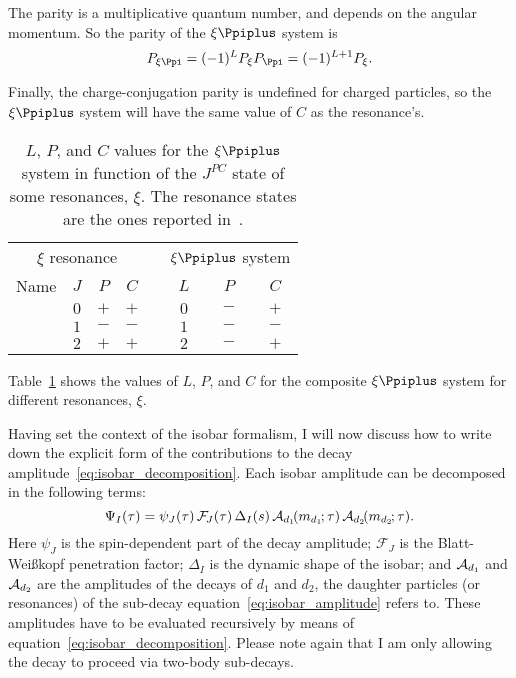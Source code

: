     The parity is a multiplicative quantum number, and depends on the angular momentum.
    So the parity of the $\xi\Ppiplus$ system is
    \begin{equation}
        P_{\xi\Ppi} = (-1)^L P_{\xi} P_{\Ppi} = (-1)^{L+1} P_{\xi}.
    \end{equation}


    Finally, the charge-conjugation parity is undefined for charged particles, so the $\xi\Ppiplus$ system will have the same value of $C$ as the resonance's. 
    \begin{table}
        \centering
        \caption{$L$, $P$, and $C$ values for the $\xi\Ppiplus$ system in function of the $J^{PC}$ state of some resonances, $\xi$.
                 The resonance states are the ones reported in~\cite{chinese_phisics}.}
        \label{table:composite_resonance_system}
        \begin{tabular}{lccccccc}
            \toprule
            \multicolumn{4}{c}{$\xi$ resonance}   & &\multicolumn{3}{c}{$\xi\Ppiplus$ system} \\ \cline{1-4} \cline{6-8}
            Name   &$J$ &$P$ &$C$                 & &$L$ &$P$ &$C$\\
            \midrule
            \Pfnez{}    &$0$ &$+$ &$+$            & &$0$ &$-$ &$+$\\
            \Prhozero{} &$1$ &$-$ &$-$            & &$1$ &$-$ &$-$\\
            \Pfii{}     &$2$ &$+$ &$+$            & &$2$ &$-$ &$+$\\
            \bottomrule
        \end{tabular}
    \end{table}
    Table~\ref{table:composite_resonance_system} shows the values of $L$, $P$, and $C$ for the composite $\xi\Ppiplus$ system for different resonances, $\xi$.


    Having set the context of the isobar formalism, I will now discuss how to write down the explicit form of the contributions to the decay amplitude~\eqref{eq:isobar_decomposition}.
    Each isobar amplitude can be decomposed in the following terms:
    \begin{equation}\label{eq:isobar_amplitude}
        \Psi_I(\tau) = \psi_J(\tau)\,\mathcal{F\!}_{J}(\tau)\,\Delta_I(s)\,\mathcal{A}_{d_1}\!(m_{d_1\!}; \tau)\,\mathcal{A}_{d_2}\!(m_{d_2\!}; \tau).
    \end{equation}
    Here $\psi_J$ is the spin-dependent part of the decay amplitude;
    $\mathcal{F\!}_J$ is the Blatt-Wei\ss{}kopf penetration factor;
    $\Delta_I$ is the dynamic shape of the isobar;
    and $\mathcal{A}_{d_1}$ and $\mathcal{A}_{d_2}$ are the amplitudes of the decays of $d_1$ and $d_2$, the daughter particles (or resonances) of the sub-decay equation~\eqref{eq:isobar_amplitude} refers to.
    These amplitudes have to be evaluated recursively by means of equation~\eqref{eq:isobar_decomposition}.
    Please note again that I am only allowing the decay to proceed via two-body sub-decays.


